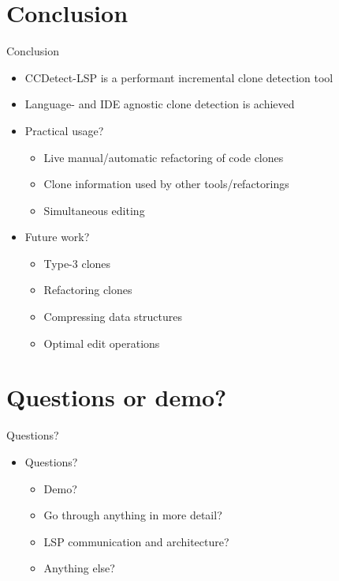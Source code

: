 \documentclass[aspectratio=1610, xcolor=table]{beamer}
\begin{document}
\section{Conclusion}
\begin{frame}{Conclusion}
	\begin{itemize}
        \item CCDetect-LSP is a performant incremental clone detection tool
        \item Language- and IDE agnostic clone detection is achieved
		\item Practical usage?
            \begin{itemize}
                \item Live manual/automatic refactoring of code clones
                \item Clone information used by other tools/refactorings
                \item Simultaneous editing
            \end{itemize}
		\item Future work?
            \begin{itemize}
                \item Type-3 clones
                \item Refactoring clones
                \item Compressing data structures
                \item Optimal edit operations
            \end{itemize}
	\end{itemize}
\end{frame}

\section{Questions or demo?}

\begin{frame}{Questions?}
    \begin{itemize}
    \item Questions?
        \begin{itemize}
            \item Demo?
            \item Go through anything in more detail?
            \item LSP communication and architecture?
            \item Anything else?
        \end{itemize}
    \end{itemize}
\end{frame}
\end{document}
